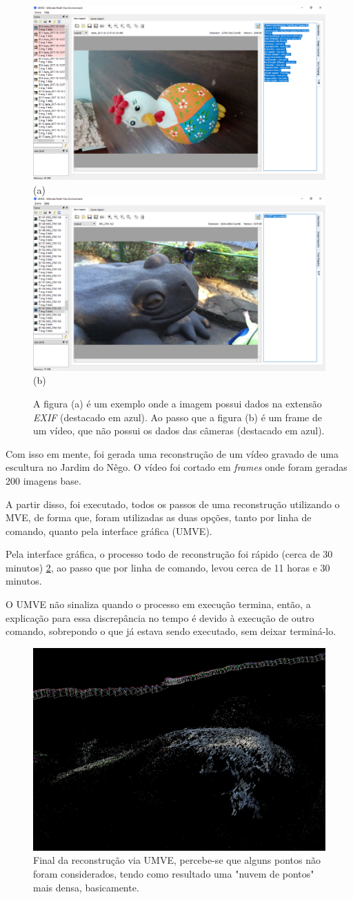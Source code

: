 \begin{figure}[!h]
	\centering
	\includegraphics[width=0.5\linewidth]{figs/exifumve.png}(a)
	\includegraphics[width=0.5\linewidth]{figs/exifsemumve.png}(b)
	\caption{%
	A figura (a) é um exemplo onde a imagem possui dados na extensão \emph{EXIF} (destacado em azul). Ao passo que a figura (b) é um frame de um vídeo, que não possui os dados das câmeras (destacado em azul).
	}\label{fig:mveexif}
\end{figure} 

Com isso em mente, foi gerada uma reconstrução de um vídeo gravado de uma escultura no Jardim do Nêgo. O  vídeo foi cortado em \emph{frames} onde foram geradas 200 imagens base. 

A partir disso, foi executado, todos os passos de uma reconstrução utilizando o MVE, de forma que, foram utilizadas as duas opções, tanto por linha de comando, quanto pela interface gráfica (UMVE).

Pela interface gráfica, o processo todo de reconstrução foi rápido (cerca de 30 minutos) \ref{fig:UMVEdense}, ao passo que por linha de comando, levou cerca de 11 horas e 30 minutos. 

O UMVE não sinaliza quando o processo em execução termina, então, a explicação para essa discrepância no tempo é devido à execução de outro comando, sobrepondo o que já estava sendo executado, sem deixar terminá-lo.

\begin{figure}[!h]
	\centering
	\includegraphics[width=0.5\linewidth]{figs/umvedense.png}
	\caption{%
	Final da reconstrução via UMVE, percebe-se que alguns pontos não foram considerados, tendo como resultado uma "nuvem de pontos" mais densa, basicamente.
	}\label{fig:UMVEdense}
\end{figure} 

